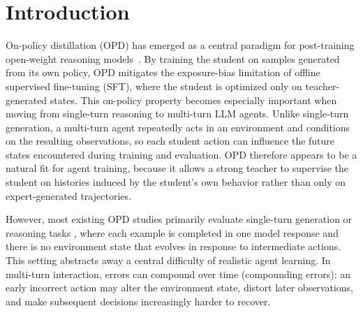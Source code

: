 \section{Introduction}
\label{sec:introduction}

On-policy distillation (OPD) has emerged as a central paradigm for post-training open-weight reasoning models~\citep{agarwal2024policy, lu2025onpolicydistillation, song2026survey}.
%
By training the student on samples generated from its own policy, OPD mitigates the exposure-bias limitation of offline supervised fine-tuning (SFT), where the student is optimized only on teacher-generated states.
%
This on-policy property becomes especially important when moving from single-turn reasoning to multi-turn LLM agents.
%
Unlike single-turn generation, a multi-turn agent repeatedly acts in an environment and conditions on the resulting observations, so each student action can influence the future states encountered during training and evaluation.
%
OPD therefore appears to be a natural fit for agent training, because it allows a strong teacher to supervise the student on histories induced by the student's own behavior rather than only on expert-generated trajectories.

However, most existing OPD studies primarily evaluate single-turn generation or reasoning tasks \citep{yang2026learning, jin2026entropy}, where each example is completed in one model response and there is no environment state that evolves in response to intermediate actions.
%
This setting abstracts away a central difficulty of realistic agent learning.
%
In multi-turn interaction, errors can compound over time (compounding errors): an early incorrect action may alter the environment state, distort later observations, and make subsequent decisions increasingly harder to recover.

